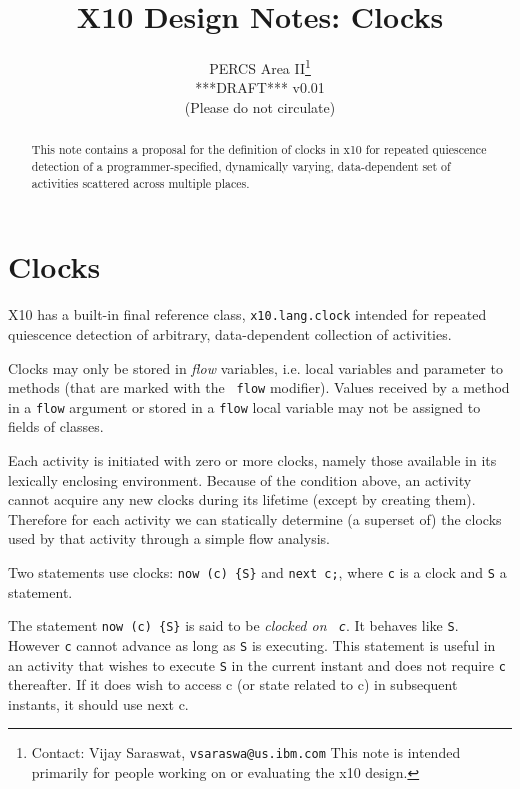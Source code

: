 \documentclass{article}
\def\ccfont{\sf}
\def\x10{{\ccfont x10}}
\def\X10{{\ccfont X10}}
\begin{document}
\title{\X10{} Design Notes: Clocks\\
}
\author{{\sc PERCS} Area II\footnote{Contact: Vijay Saraswat, {\tt vsaraswa@us.ibm.com} This note is intended primarily for people working on or evaluating the \x10{} design.}\\ 
{\sc ****DRAFT*** v0.01}\\ 
(Please do not circulate)
}

\maketitle

\begin{abstract}
This note contains a proposal for the definition of clocks in \x10{} for repeated quiescence detection of a programmer-specified, dynamically varying, data-dependent set of activities scattered across multiple places. 
\end{abstract}

\section{Clocks}

\X10{}  has a built-in final reference class, {\tt x10.lang.clock} intended
for repeated quiescence detection of arbitrary, data-dependent
collection of activities.

Clocks may only be stored in {\em flow} variables, i.e.{} local
variables and parameter to methods (that are marked with the {\tt
flow} modifier).  Values received by a method in a {\tt flow} argument
or stored in a {\tt flow} local variable may not be assigned to fields
of classes.

Each activity is initiated with zero or more clocks, namely those
available in its lexically enclosing environment.  Because of the
condition above, an activity cannot acquire any new clocks during its
lifetime (except by creating them). Therefore for each activity we can
statically determine (a superset of) the clocks used by that activity
through a simple flow analysis.


Two statements use clocks: {\tt now (c) \{S\}} and {\tt next c;},
where {\tt c} is a clock and {\tt S} a statement.

The statement {\tt now (c) \{S\}} is said to be {\em clocked on {\tt
c}}. It behaves like {\tt S}. However {\tt c} cannot advance as long
as {\tt S} is executing. This statement is useful in an activity that
wishes to execute {\tt S} in the current instant and does not require
{\tt c} thereafter. If it does wish to access c (or state related to
c) in subsequent instants, it should use next c.
\end{document}
